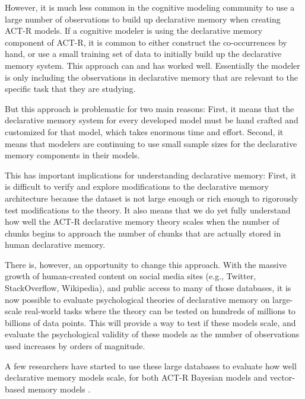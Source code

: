 \documentclass[man,floatsintext,donotrepeattitle]{apa6}
\begin{document}
However, it is much less common in the cognitive modeling community to use a large number of observations to build up declarative memory when creating ACT-R models.
If a cognitive modeler is using the declarative memory component of ACT-R,
it is common to either construct the co-occurrences by hand, or use a small training set of data to initially build up the declarative memory system.
This approach can and has worked well.
Essentially the modeler is only including the observations in declarative memory that are relevant to the specific task that they are studying.

But this approach is problematic for two main reasons:
First, it means that the declarative memory system for every developed model must be hand crafted and customized for that model, which takes enormous time and effort.
Second, it means that modelers are continuing to use small sample sizes for the declarative memory components in their models.

This has important implications for understanding declarative memory:
First, it is difficult to verify and explore modifications to the declarative memory architecture because the dataset is not large enough or rich enough to rigorously test modifications to the theory.
It also means that we do yet fully understand how well the ACT-R declarative memory theory scales when the number of chunks begins to approach the number of chunks that are actually stored in human declarative memory.

There is, however, an opportunity to change this approach.
With the massive growth of human-created content on social media sites (e.g., Twitter, StackOverflow, Wikipedia), and public access to many of those databases,
it is now possible to evaluate psychological theories of declarative memory on large-scale real-world tasks where the theory can be tested on hundreds of millions to billions of data points.
This will provide a way to test if these models scale, and evaluate the psychological validity of these models as the number of observations used increases by orders of magnitude.

A few researchers have started to use these large databases to evaluate how well declarative memory models scale,
for both ACT-R Bayesian models \parencites{Fu2007,Pirolli2003,Stanley2013,Douglass2010} and vector-based memory models \parencites{Jones2007,Rutledge2008,Recchia2010,Sahlgren2008}.
\end{document}
